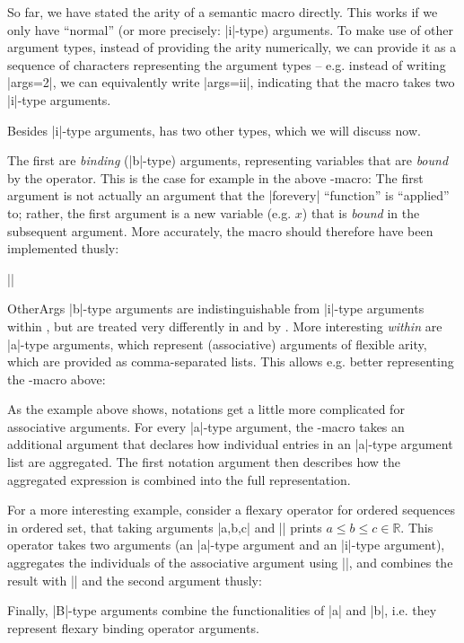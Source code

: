 So far, we have stated the arity of a semantic macro directly.
 This works if we only have ``normal'' (or more precisely: |i|-type) arguments.
  To make use of other argument types, instead of providing the arity
 numerically, we can provide it as a sequence of characters representing
 the argument types -- e.g. instead of writing |args=2|, we
 can equivalently write |args=ii|, indicating that the macro
 takes two |i|-type arguments.

 Besides |i|-type arguments, \sTeX has two other types, which we will
 discuss now.

 The first are \emph{binding} (|b|-type) arguments, representing
 variables that are \emph{bound} by the operator. This is the
 case for example in the above -macro:
 The first argument is not actually an argument that the
 |forevery| ``function'' is ``applied'' to; rather, the first argument
 is a new variable (e.g. $x$) that is \emph{bound} in the subsequent
 argument. More accurately, the macro should therefore have been
 implemented thusly:
   \begin{center}||\end{center}

 \begin{@module}{OtherArgs}
 |b|-type arguments are indistinguishable from |i|-type arguments
 within \sTeX, but are treated very differently in \omdoc and by \mmt.
 More interesting \emph{within} \sTeX are |a|-type arguments,
 which represent (associative) arguments of flexible arity, which are
 provided as comma-separated lists.
 This allows e.g. better representing the -macro above:
 
 As the example above shows, notations get a little more complicated
 for associative arguments. For every |a|-type argument, the
 -macro takes an additional argument that declares
 how individual entries in an |a|-type argument list are aggregated.
 The first notation argument then describes how the aggregated
 expression is combined into the full representation.

 For a more interesting example, consider a flexary operator
 for ordered sequences in ordered set, that taking 
 arguments |{a,b,c}| and || prints
 $a \leq b \leq c\in \mathbb R$. This operator takes
 two arguments (an |a|-type argument and an |i|-type argument),
 aggregates the individuals of the associative argument using |\leq|,
 and combines the result with |\in| and the second argument thusly:


 Finally, |B|-type arguments combine the functionalities of |a|
 and |b|, i.e. they represent flexary binding operator arguments.


 \end{@module}

